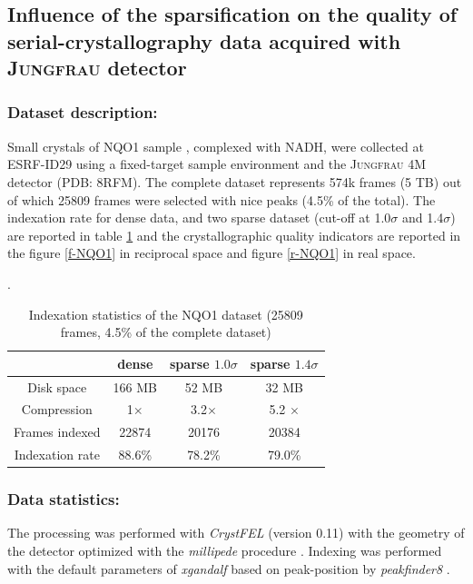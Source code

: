 \documentclass[preprint]{iucr}              %
\begin{document}
\subsection{Influence of the sparsification on the quality of serial-crystallography data acquired with \textsc{Jungfrau} detector}
\subsubsection{Dataset description:} 

Small crystals of NQO1 sample \cite{NQO1}, complexed with NADH, were collected at ESRF-ID29 using a fixed-target sample environment and the \textsc{Jungfrau} 4M detector (PDB: 8RFM). 
The complete dataset represents 574k frames (5 TB) out of which 25809 frames were selected with nice peaks (4.5\% of the total).
The indexation rate for dense data, and two sparse dataset (cut-off at 1.0$\sigma$ and 1.4$\sigma$) are reported in table \ref{t-NQO1} and the crystallographic quality indicators are reported in the figure \ref{f-NQO1} in reciprocal space and figure \ref{r-NQO1} in real space. 

\begin{table}
\label{t-NQO1}
\begin{center}
\caption{Indexation statistics of the NQO1 dataset (25809 frames, 4.5\% of the complete dataset)}.
\begin{tabular}{|c|c | c | c |} 
\hline
       & dense & sparse $1.0\sigma$ & sparse $1.4\sigma$ \\ 
\hline
Disk space & 166 MB & 52 MB & 32 MB \\
Compression & 1$\times$ & 3.2$\times$ & 5.2 $\times$ \\
Frames indexed  & 22874 & 20176 & 20384 \\
Indexation rate & 88.6\%& 78.2\% & 79.0\%\\
\hline
\end{tabular}
\end{center}
\end{table}

\subsubsection{Data statistics:}

The processing was performed with \textit{CrystFEL} \cite{CrystFEL} (version 0.11) with the geometry of the detector optimized with the \textit{millipede} procedure \cite{millepede, millepede2}. 
Indexing was performed with the default parameters of \textit{xgandalf} \cite{xgandalf} based on peak-position by \textit{peakfinder8} \cite{Cheetah2014}.
\end{document}
